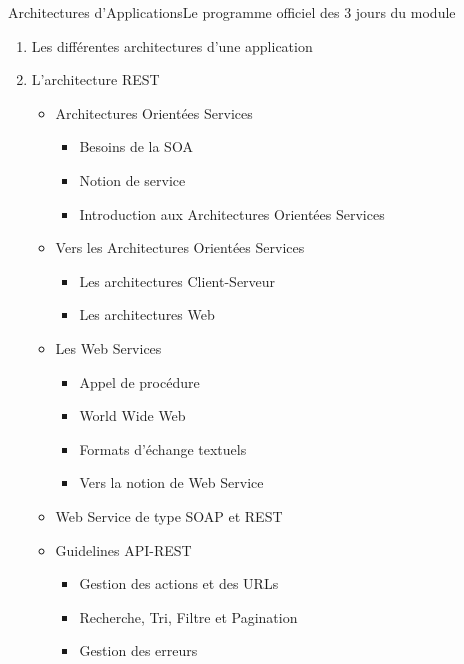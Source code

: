\documentclass{beamer}
\begin{document}
    \begin{frame}{Architectures d’Applications}{Le programme officiel des 3 jours du module}
        \fontsize{8pt}{8pt}\selectfont
        \begin{enumerate}
            \item Les différentes architectures d’une application
            \item L’architecture REST
            \begin{itemize}
                \fontsize{8pt}{8pt}\selectfont
                \item Architectures Orientées Services
                \begin{itemize}
                    \item Besoins de la SOA
                    \item Notion de service
                    \item Introduction aux Architectures Orientées Services
                \end{itemize}
                \item Vers les Architectures Orientées Services
                \begin{itemize}
                    \item Les architectures Client-Serveur
                    \item Les architectures Web
                \end{itemize}
                \item Les Web Services
                \begin{itemize}
                    \item Appel de procédure
                    \item World Wide Web
                    \item Formats d’échange textuels
                    \item Vers la notion de Web Service
                \end{itemize}
                \item Web Service de type SOAP et REST
                \item Guidelines API-REST
                \begin{itemize}
                    \item Gestion des actions et des URLs
                    \item Recherche, Tri, Filtre et Pagination
                    \item Gestion des erreurs
                \end{itemize}
            \end{itemize}
        \end{enumerate}
    \end{frame}
\end{document}
